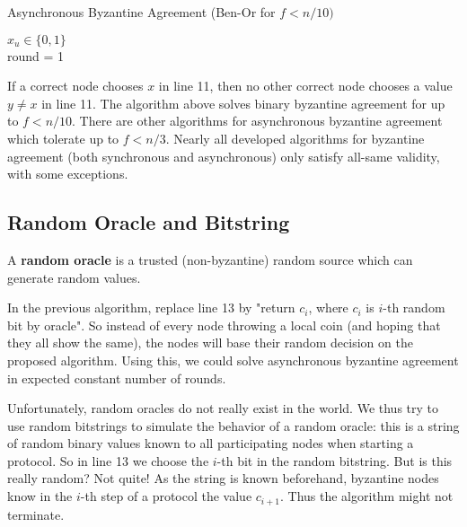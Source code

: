 \begin{algorithm}[H]
\caption{Asynchronous Byzantine Agreement (Ben-Or for $f < n/10)$}
	$x_u \in \{0,1\}$ \\
	round = 1
	
	\BlankLine
	
	
\end{algorithm}
\medskip

If a correct node chooses $x$ in line 11, then no other correct node chooses a value $y \neq x$ in line 11. The algorithm above solves binary byzantine agreement for up to $f < n/10$. There are other algorithms for asynchronous byzantine agreement which tolerate up to $f < n/3$. Nearly all developed algorithms for byzantine agreement (both synchronous and asynchronous) only satisfy all-same validity, with some exceptions.


\subsection{Random Oracle and Bitstring}

A \textbf{random oracle} is a trusted (non-byzantine) random source which can generate random values. \medskip

In the previous algorithm, replace line 13 by "return $c_i$, where $c_i$ is $i$-th random bit by oracle". So instead of every node throwing a local coin (and hoping that they all show the same), the nodes will base their random decision on the proposed algorithm. Using this, we could solve asynchronous byzantine agreement in expected constant number of rounds. \medskip

Unfortunately, random oracles do not really exist in the world. We thus try to use random bitstrings to simulate the behavior of a random oracle: this is a string of random binary values known to all participating nodes when starting a protocol. So in line 13 we choose the $i$-th bit in the random bitstring. But is this really random? Not quite! As the string is known beforehand, byzantine nodes know in the $i$-th step of a protocol the value $c_{i+1}$. Thus the algorithm might not terminate.
